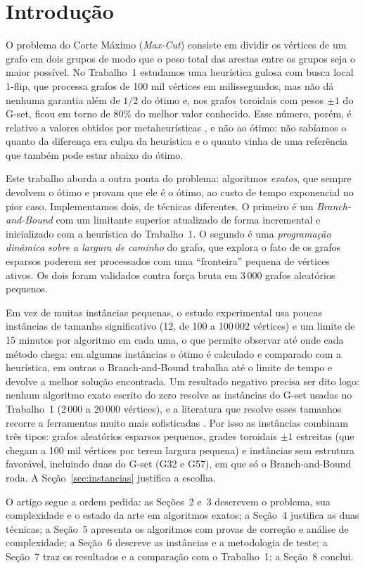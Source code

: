 \section{Introdução}

O problema do Corte Máximo (\emph{Max-Cut}) consiste em dividir os vértices de um grafo em dois grupos de modo que o peso total das arestas entre os grupos seja o maior possível. No Trabalho~1 estudamos uma heurística gulosa com busca local 1-flip, que processa grafos de 100 mil vértices em milissegundos, mas não dá nenhuma garantia além de $1/2$ do ótimo e, nos grafos toroidais com pesos $\pm1$ do G-set, ficou em torno de 80\% do melhor valor conhecido. Esse número, porém, é relativo a valores obtidos por metaheurísticas \cite{Benlic and Hao 2013}, e não ao ótimo: não sabíamos o quanto da diferença era culpa da heurística e o quanto vinha de uma referência que também pode estar abaixo do ótimo.

Este trabalho aborda a outra ponta do problema: algoritmos \emph{exatos}, que sempre devolvem o ótimo e provam que ele é o ótimo, ao custo de tempo exponencial no pior caso. Implementamos dois, de técnicas diferentes. O primeiro é um \emph{Branch-and-Bound} com um limitante superior atualizado de forma incremental e inicializado com a heurística do Trabalho~1. O segundo é uma \emph{programação dinâmica sobre a largura de caminho} do grafo, que explora o fato de os grafos esparsos poderem ser processados com uma ``fronteira'' pequena de vértices ativos. Os dois foram validados contra força bruta em 3\,000 grafos aleatórios pequenos.

Em vez de muitas instâncias pequenas, o estudo experimental usa poucas instâncias de tamanho significativo (12, de 100 a 100\,002 vértices) e um limite de 15 minutos por algoritmo em cada uma, o que permite observar até onde cada método chega: em algumas instâncias o ótimo é calculado e comparado com a heurística, em outras o Branch-and-Bound trabalha até o limite de tempo e devolve a melhor solução encontrada. Um resultado negativo precisa ser dito logo: nenhum algoritmo exato escrito do zero resolve as instâncias do G-set usadas no Trabalho~1 (2\,000 a 20\,000 vértices), e a literatura que resolve esses tamanhos recorre a ferramentas muito mais sofisticadas \cite{Liers et al. 2004, Rendl et al. 2010}. Por isso as instâncias combinam três tipos: grafos aleatórios esparsos pequenos, grades toroidais $\pm1$ estreitas (que chegam a 100 mil vértices por terem largura pequena) e instâncias sem estrutura favorável, incluindo duas do G-set (G32 e G57), em que só o Branch-and-Bound roda. A Seção~\ref{sec:instancias} justifica a escolha.

O artigo segue a ordem pedida: as Seções~2 e~3 descrevem o problema, sua complexidade e o estado da arte em algoritmos exatos; a Seção~4 justifica as duas técnicas; a Seção~5 apresenta os algoritmos com provas de correção e análise de complexidade; a Seção~6 descreve as instâncias e a metodologia de teste; a Seção~7 traz os resultados e a comparação com o Trabalho~1; a Seção~8 conclui.

